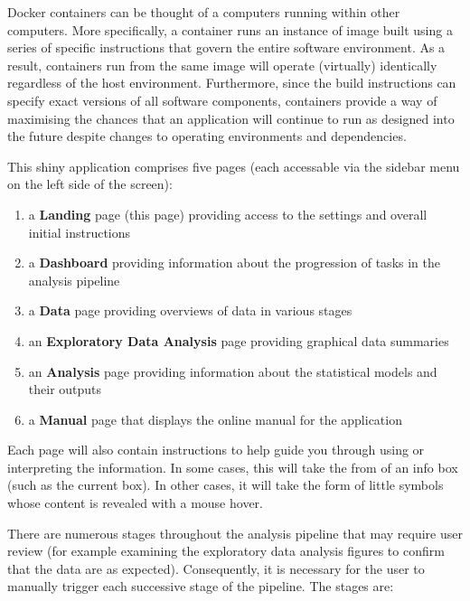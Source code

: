 \documentclass[
  8pt,
  a4paper]{article}
\providecommand{\tightlist}{%
  \setlength{\itemsep}{0pt}\setlength{\parskip}{0pt}}\usepackage{longtable,booktabs,array}
\begin{document}
Docker containers can be thought of a computers running within other
computers. More specifically, a container runs an instance of image
built using a series of specific instructions that govern the entire
software environment. As a result, containers run from the same image
will operate (virtually) identically regardless of the host environment.
Furthermore, since the build instructions can specify exact versions of
all software components, containers provide a way of maximising the
chances that an application will continue to run as designed into the
future despite changes to operating environments and dependencies.

This shiny application comprises five pages (each accessable via the
sidebar menu on the left side of the screen):

\begin{enumerate}
\def\labelenumi{\arabic{enumi}.}
\tightlist
\item
  a \textbf{Landing} page (this page) providing access to the settings
  and overall initial instructions
\item
  a \textbf{Dashboard} providing information about the progression of
  tasks in the analysis pipeline
\item
  a \textbf{Data} page providing overviews of data in various stages
\item
  an \textbf{Exploratory Data Analysis} page providing graphical data
  summaries
\item
  an \textbf{Analysis} page providing information about the statistical
  models and their outputs
\item
  a \textbf{Manual} page that displays the online manual for the
  application
\end{enumerate}

Each page will also contain instructions to help guide you through using
or interpreting the information. In some cases, this will take the from
of an info box (such as the current box). In other cases, it will take
the form of little {} symbols whose content is revealed with a mouse
hover.

There are numerous stages throughout the analysis pipeline that may
require user review (for example examining the exploratory data analysis
figures to confirm that the data are as expected). Consequently, it is
necessary for the user to manually trigger each successive stage of the
pipeline. The stages are:
\end{document}
